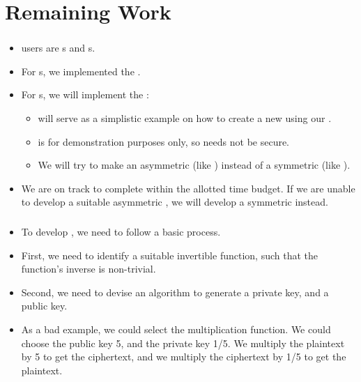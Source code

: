 \section{Remaining Work}


\begin{frame}
\frametitle{}
\begin{itemize}
\item \cry{} users are \eu s and \cg s.
\item For \eu s, we implemented the \rsa{} \cs.
\item For \cg s, we will implement the \dummy{} \cs:
  \begin{itemize}
  \item \dummy{} will serve as a simplistic example
    on how to create a new \cs{} using our \cry{} \cf.
  \item \dummy{} is for demonstration purposes only,
    so \dummy{} needs not be secure.
  \item We will try to make \dummy{} an asymmetric \cs{}
    (like \rsa) instead of a symmetric \cs{} (like \aes).
  \end{itemize}
\item We are on track to complete \cry{} within the allotted
  time budget. If we are unable to develop a suitable
  asymmetric \cs{}, we will develop a symmetric \cs{}
  instead.
\end{itemize}
\end{frame}

\begin{frame}
\frametitle{}
\begin{itemize}
  \item To develop \dummy{}, we need to follow a basic
    process.
  \item First, we need to identify a suitable invertible
    function, such that the function's inverse is
    non-trivial.
  \item Second, we need to devise an algorithm to generate
    a private key, and a public key.
  \item As a bad example, we could select the multiplication
    function. We could choose the public key 5, and the
    private key 1/5. We multiply the plaintext by 5 to get
    the ciphertext, and we multiply the ciphertext by 1/5 to
    get the plaintext.
\end{itemize}
\end{frame}

